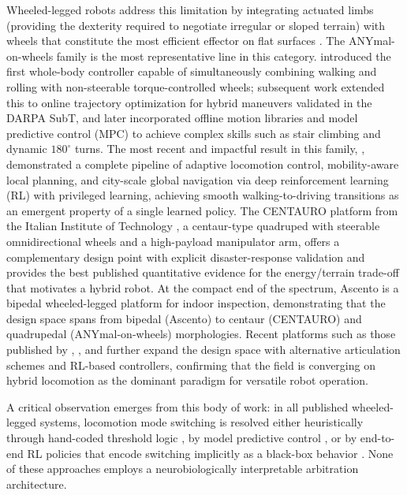 Wheeled-legged robots address this limitation by integrating actuated limbs (providing the dexterity required to negotiate irregular or sloped terrain) with wheels that constitute the most efficient effector on flat surfaces \citep{Bjelonic2023Survey}. The ANYmal-on-wheels family is the most representative line in this category. \citet{Bjelonic2019KeepRollin} introduced the first whole-body controller capable of simultaneously combining walking and rolling with non-steerable torque-controlled wheels; subsequent work \citep{bjelonic2019} extended this to online trajectory optimization for hybrid maneuvers validated in the DARPA SubT, and \citet{Bjelonic2022OfflineMotion} later incorporated offline motion libraries and model predictive control (MPC) to achieve complex skills such as stair climbing and dynamic $180^{\circ}$ turns. The most recent and impactful result in this family, \citet{Lee2024Science}, demonstrated a complete pipeline of adaptive locomotion control, mobility-aware local planning, and city-scale global navigation via deep reinforcement learning (RL) with privileged learning, achieving smooth walking-to-driving transitions as an emergent property of a single learned policy. The CENTAURO platform from the Italian Institute of Technology \citep{Kashiri2019CENTAURO,Klamt2019CENTAURO}, a centaur-type quadruped with steerable omnidirectional wheels and a high-payload manipulator arm, offers a complementary design point with explicit disaster-response validation and provides the best published quantitative evidence for the energy/terrain trade-off that motivates a hybrid robot. At the compact end of the spectrum, Ascento \citep{Klemm2019Ascento} is a bipedal wheeled-legged platform for indoor inspection, demonstrating that the design space spans from bipedal (Ascento) to centaur (CENTAURO) and quadrupedal (ANYmal-on-wheels) morphologies. Recent platforms such as those published by \citet{Liu2024Max}, \citet{Cui2025FLORES}, and \citet{Jiang2025RTaichi} further expand the design space with alternative articulation schemes and RL-based controllers, confirming that the field is converging on hybrid locomotion as the dominant paradigm for versatile robot operation.

A critical observation emerges from this body of work: in all published wheeled-legged systems, locomotion mode switching is resolved either heuristically through hand-coded threshold logic \citep{Kashiri2019CENTAURO}, by model predictive control \citep{bjelonic2019,Bjelonic2022OfflineMotion}, or by end-to-end RL policies that encode switching implicitly as a black-box behavior \citep{Lee2024Science,Humphreys2025BioInspired}. None of these approaches employs a neurobiologically interpretable arbitration architecture. 


